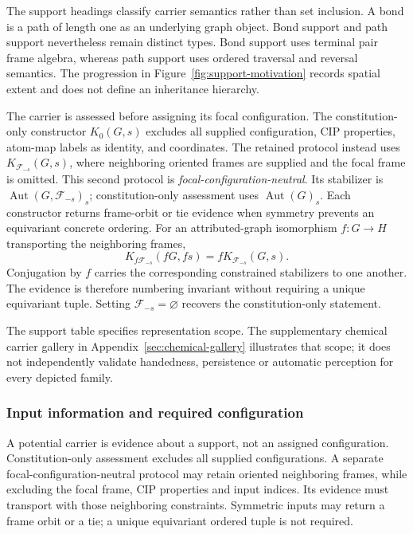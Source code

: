 \documentclass[pdflatex,sn-mathphys-num,referee,lineno]{sn-jnl}
\theoremstyle{plain}
\theoremstyle{remark}
\theoremstyle{definition}
\begin{document}
The support headings classify carrier semantics rather than set inclusion.
A bond is a path of length one as an underlying graph object.  Bond support and
path support nevertheless remain distinct types.  Bond support uses terminal
pair frame algebra, whereas path support uses ordered traversal and reversal
semantics.  The progression in Figure~\ref{fig:support-motivation} records
spatial extent and does not define an inheritance hierarchy.

The carrier is assessed before assigning its focal configuration. The
constitution-only constructor \(K_0(G,s)\) excludes all supplied configuration,
CIP properties, atom-map labels as identity, and coordinates. The retained
protocol instead uses \(K_{\mathcal F_{-s}}(G,s)\), where neighboring oriented
frames are supplied and the focal frame is omitted. This second protocol is
\emph{focal-configuration-neutral}. Its stabilizer is
\(\operatorname{Aut}(G,\mathcal F_{-s})_s\); constitution-only assessment uses
\(\operatorname{Aut}(G)_s\). Each constructor returns frame-orbit or tie
evidence when symmetry prevents an equivariant concrete ordering. For an
attributed-graph isomorphism \(f:G\to H\) transporting the neighboring frames,
\[
  K_{f\mathcal F_{-s}}(fG,fs)=fK_{\mathcal F_{-s}}(G,s).
\]
Conjugation by \(f\) carries the corresponding constrained stabilizers to one
another. The evidence is therefore numbering invariant without requiring a
unique equivariant tuple. Setting \(\mathcal F_{-s}=\varnothing\) recovers
the constitution-only statement.

The support table specifies representation scope. The supplementary chemical
carrier gallery in Appendix~\ref{sec:chemical-gallery} illustrates that scope;
it does not independently validate handedness, persistence or automatic
perception for every depicted family.

\subsubsection{Input information and required configuration}
\label{sec:input-boundaries}

A potential carrier is evidence about a support, not an assigned configuration.
Constitution-only assessment excludes all supplied configurations. A separate
focal-configuration-neutral protocol may retain oriented neighboring frames,
while excluding the focal frame, CIP properties and input indices. Its evidence
must transport with those neighboring constraints. Symmetric inputs may return
a frame orbit or a tie; a unique equivariant ordered tuple is not required.
\end{document}
